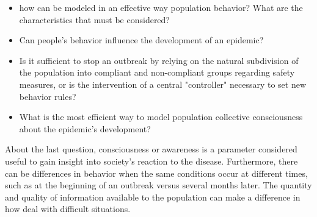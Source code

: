 \begin{itemize}
	\item how can be modeled in an effective way population behavior? What are the characteristics that must be considered?
	\item Can people's behavior influence the development of an epidemic?
	\item Is it sufficient to stop an outbreak by relying on the natural subdivision of the population into compliant and non-compliant groups regarding safety measures, or is the intervention of a central "controller" necessary to set new behavior rules?
	\item What is the most efficient way to model population collective consciousness about the epidemic's development? 
\end{itemize}
About the last question, consciousness or awareness is a parameter considered useful to gain insight into society's reaction to the disease. Furthermore, there can be differences in behavior when the same conditions occur at different times, such as at the beginning of an outbreak versus several months later. The quantity and quality of information available to the population can make a difference in how deal with difficult situations.

